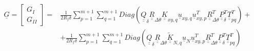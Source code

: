 \documentclass[review]{elsarticle}
\begin{document}
\begin{equation}\label{eq:gIandIIlong}
\begin{split}
\underline{G}=\begin{bmatrix}
G_{I} \\
G_{II}
\end{bmatrix}=&\frac{1}{2R_{f}\delta}\sum_{p=1}^{m+1}\sum_{q=1}^{m+1}Diag\left(\underline{\underline{Q}}_{\delta}\underline{\underline{R}}_{\Delta\theta}\underline{\underline{K}}_{xy,q}\underline{u}_{xy,q}\underline{u}_{xy,p}^{T}\underline{\underline{R}}_{\Delta\theta}^{T}\underline{\underline{P}}_{\delta}^{T}\underline{\underline{T}}_{pq}^{T}\right)+\\
&+\frac{1}{2R_{f}\delta}\sum_{p=1}^{m+1}\sum_{q=1}^{m+1}Diag\left(\underline{\underline{Q}}_{\delta}\underline{\underline{R}}_{\Delta\theta}\underline{\underline{\widetilde{K}}}_{N,q}\underline{u}_{N}\underline{u}_{xy,p}^{T}\underline{\underline{R}}_{\Delta\theta}^{T}\underline{\underline{P}}_{\delta}^{T}\underline{\underline{T}}_{pq}^{T}\right)
\end{split}
\end{equation}
\end{document}
